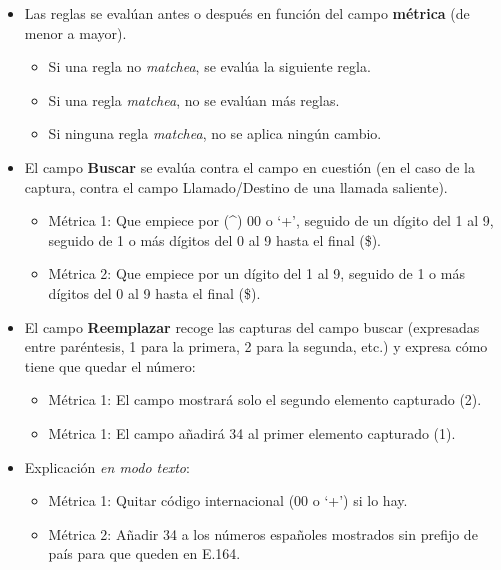 \documentclass[letterpaper,10pt,spanish]{sphinxmanual}
\begin{document}
\noindent{}
\begin{itemize}
\item {} 
Las reglas se evalúan antes o después en función del campo \textbf{métrica} (de menor a mayor).
\begin{itemize}
\item {} 
Si una regla no \emph{matchea}, se evalúa la siguiente regla.

\item {} 
Si una regla \emph{matchea}, no se evalúan más reglas.

\item {} 
Si ninguna regla \emph{matchea}, no se aplica ningún cambio.

\end{itemize}

\item {} 
El campo \textbf{Buscar} se evalúa contra el campo en cuestión (en el caso de la captura, contra el campo Llamado/Destino de una llamada saliente).
\begin{itemize}
\item {} 
Métrica 1: Que empiece por (\textasciicircum{}) 00 o `+', seguido de un dígito del 1 al 9, seguido de 1 o más dígitos del 0 al 9 hasta el final (\$).

\item {} 
Métrica 2: Que empiece por un dígito del 1 al 9, seguido de 1 o más dígitos del 0 al 9 hasta el final (\$).

\end{itemize}

\item {} 
El campo \textbf{Reemplazar} recoge las capturas del campo buscar (expresadas entre paréntesis, 1 para la primera, 2 para la segunda, etc.) y expresa cómo tiene que quedar el número:
\begin{itemize}
\item {} 
Métrica 1: El campo mostrará solo el segundo elemento capturado (2).

\item {} 
Métrica 1: El campo añadirá 34 al primer elemento capturado (1).

\end{itemize}

\item {} 
Explicación \emph{en modo texto}:
\begin{itemize}
\item {} 
Métrica 1: Quitar código internacional (00 o `+') si lo hay.

\item {} 
Métrica 2: Añadir 34 a los números españoles mostrados sin prefijo de país para que queden en E.164.

\end{itemize}

\end{itemize}
\end{document}
